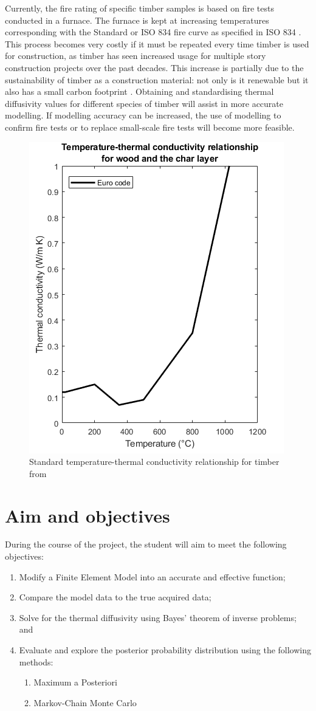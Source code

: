 Currently, the fire rating of specific timber samples is based on fire tests conducted in a furnace. 
The furnace is kept at increasing temperatures corresponding with the Standard or ISO 834 fire curve as specified in ISO 834 \citet{ISO:1999}.
This process becomes very costly if it must be repeated every time timber is used for construction, as timber has seen increased usage for multiple story construction projects over the past decades. 
This increase is partially due to the sustainability of timber as a construction material: not only is it renewable but it also has a small carbon footprint \citep{Salvadori:2017}.
Obtaining and standardising thermal diffusivity values for different species of timber will assist in more accurate modelling.
If modelling accuracy can be increased, the use of modelling to confirm fire tests or to replace small-scale fire tests will become more feasible.

	\begin{figure}
	\label{kvalue_fig}
	\centering
	\includegraphics[width = 0.5\linewidth]{figures/Eurok.png}
	\caption{Standard temperature-thermal conductivity relationship for timber from \citep{Euro:2004}}
	\end{figure}
	
	

\section{Aim and objectives}
During the course of the project, the student will aim to meet the following objectives:
\begin{enumerate}
 \item Modify a Finite Element Model into an accurate and effective function;
 \item Compare the model data to the true acquired data;
 \item Solve for the thermal diffusivity using Bayes' theorem of inverse problems; and
 \item Evaluate and explore the posterior probability distribution using the following methods:
 	\begin{enumerate}
 		\item Maximum a Posteriori
 		\item Markov-Chain Monte Carlo 	
 	\end{enumerate}
\end{enumerate}


